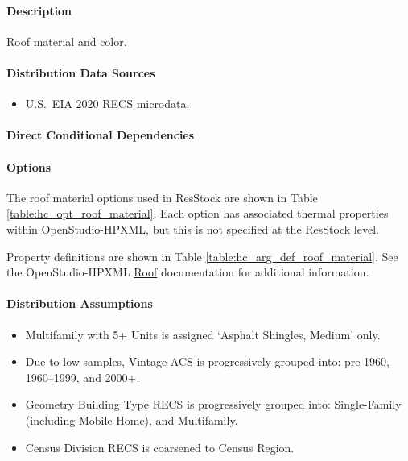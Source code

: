 \paragraph{Description}
% 
Roof material and color.

\paragraph{Distribution Data Sources}
% 
\begin{itemize}

\item
  U.S.~EIA 2020 RECS microdata.
\end{itemize}

\paragraph{Direct Conditional Dependencies}


\paragraph{Options}
The roof material options used in ResStock are shown in Table \ref{table:hc_opt_roof_material}. Each option has associated thermal properties within OpenStudio-HPXML, but this is not specified at the ResStock level.



Property definitions are shown in Table \ref{table:hc_arg_def_roof_material}. See the OpenStudio-HPXML \href{https://openstudio-hpxml.readthedocs.io/en/v1.10.0/workflow_inputs.html#hpxml-roof}{Roof} documentation for additional information.



\paragraph{Distribution Assumptions}
% 
\begin{itemize}

\item
  Multifamily with 5+ Units is assigned `Asphalt
  Shingles, Medium' only.
\item
  Due to low samples, Vintage ACS is progressively grouped into:
  pre-1960, 1960--1999, and 2000+.
\item
  Geometry Building Type RECS is progressively grouped into:
  Single-Family (including Mobile Home), and Multifamily.
\item
  Census Division RECS is coarsened to Census Region.
\end{itemize}
